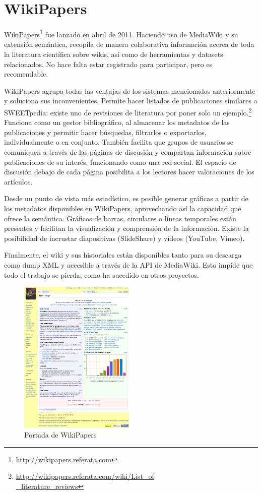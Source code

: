 \documentclass[11pt,twocolumn]{article}
\begin{document}
\section{WikiPapers}
WikiPapers\footnote{\href{http://wikipapers.referata.com}{http://wikipapers.referata.com}} fue lanzado en abril de 2011. Haciendo uso de MediaWiki y su extensión semántica, recopila de manera colaborativa información acerca de toda la literatura científica sobre wikis, así como de herramientas y datasets relacionados. No hace falta estar registrado para participar, pero es recomendable.

WikiPapers agrupa todas las ventajas de los sistemas mencionados anteriormente y soluciona sus inconvenientes. Permite hacer listados de publicaciones similares a SWEETpedia: existe uno de revisiones de literatura por poner solo un ejemplo.\footnote{\href{http://wikipapers.referata.com/wiki/List_of_literature_reviews}{http://wikipapers.referata.com/wiki/List\_of\\ \_literature\_reviews}} Funciona como un gestor bibliográfico, al almacenar los metadatos de las publicaciones y permitir hacer búsquedas, filtrarlos o exportarlos, individualmente o en conjunto. También facilita que grupos de usuarios se comuniquen a través de las páginas de discusión y compartan información sobre publicaciones de su interés, funcionando como una red social. El espacio de discusión debajo de cada página posibilita a los lectores hacer valoraciones de los artículos.

Desde un punto de vista más estadístico, es posible generar gráficas a partir de los metadatos disponibles en WikiPapers, aprovechando así la capacidad que ofrece la semántica. Gráficos de barras, circulares o líneas temporales están presentes y facilitan la visualización y comprensión de la información. Existe la posibilidad de incrustar diapositivas (SlideShare) y vídeos (YouTube, Vimeo).

Finalmente, el wiki y sus historiales están disponibles tanto para su descarga como dump XML y accesible a través de la API de MediaWiki. Esto impide que todo el trabajo se pierda, como ha sucedido en otros proyectos.

\begin{figure}[htb]
\centering
\includegraphics[width=0.49\textwidth]{wpfull.png}
\caption{Portada de WikiPapers}
\label{fig:wpfull}
\end{figure}
\end{document}
